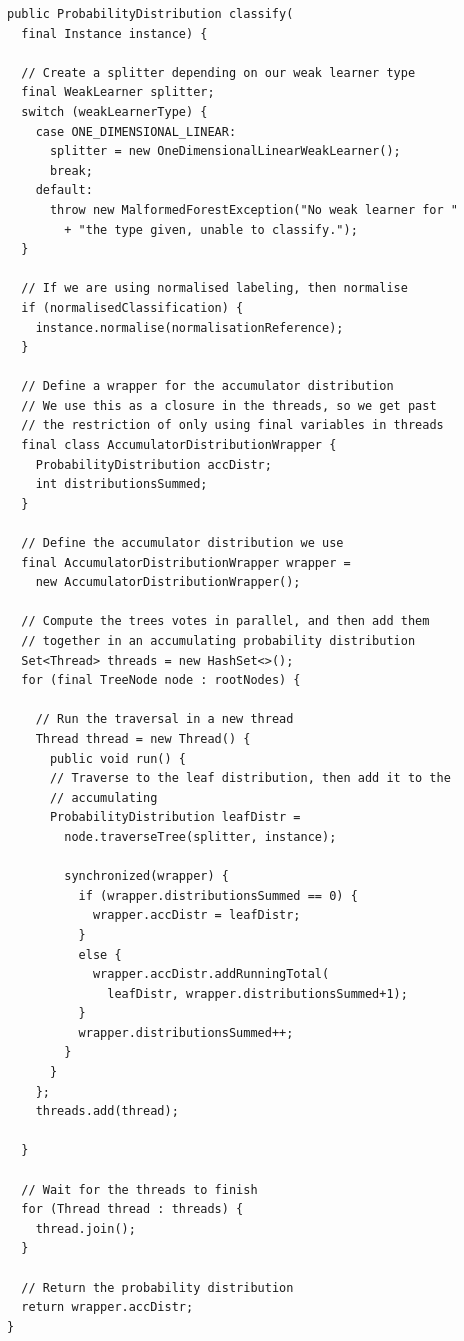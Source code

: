 \documentclass[12pt,twoside,notitlepage]{report}
\begin{document}
    \begin{lstlisting}[float=tp,caption={The implementation code for classification using a decision forest.}, label={lst:actualTraverseTree}]
public ProbabilityDistribution classify(
  final Instance instance) {
  
  // Create a splitter depending on our weak learner type
  final WeakLearner splitter;
  switch (weakLearnerType) {
    case ONE_DIMENSIONAL_LINEAR:
      splitter = new OneDimensionalLinearWeakLearner();
      break;
    default:
      throw new MalformedForestException("No weak learner for "
        + "the type given, unable to classify.");
  }
  
  // If we are using normalised labeling, then normalise
  if (normalisedClassification) {
    instance.normalise(normalisationReference);
  }
  
  // Define a wrapper for the accumulator distribution
  // We use this as a closure in the threads, so we get past 
  // the restriction of only using final variables in threads
  final class AccumulatorDistributionWrapper {
    ProbabilityDistribution accDistr;
    int distributionsSummed;
  }
  
  // Define the accumulator distribution we use
  final AccumulatorDistributionWrapper wrapper = 
    new AccumulatorDistributionWrapper();
  
  // Compute the trees votes in parallel, and then add them 
  // together in an accumulating probability distribution
  Set<Thread> threads = new HashSet<>();
  for (final TreeNode node : rootNodes) {
    
    // Run the traversal in a new thread
    Thread thread = new Thread() {
      public void run() {
      // Traverse to the leaf distribution, then add it to the 
      // accumulating
      ProbabilityDistribution leafDistr = 
        node.traverseTree(splitter, instance);

        synchronized(wrapper) {
          if (wrapper.distributionsSummed == 0) {
            wrapper.accDistr = leafDistr;
          }
          else {
            wrapper.accDistr.addRunningTotal(
              leafDistr, wrapper.distributionsSummed+1);
          }
          wrapper.distributionsSummed++;
        }
      }
    };
    threads.add(thread);
    
  }
  
  // Wait for the threads to finish
  for (Thread thread : threads) {
    thread.join();
  }
  
  // Return the probability distribution
  return wrapper.accDistr;
}
    \end{lstlisting}
\end{document}
